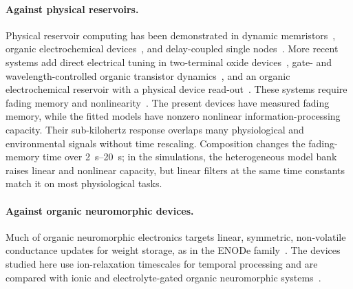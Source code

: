 \documentclass[12pt, twoside]{report}
\begin{document}
\paragraph{Against physical reservoirs.} Physical reservoir computing has been demonstrated in dynamic memristors~\cite{Du2017,Zhong2021}, organic electrochemical devices~\cite{Cucchi2021}, and delay-coupled single nodes~\cite{Appeltant2011}. More recent systems add direct electrical tuning in two-terminal oxide devices~\cite{Lee2025TunableRC}, gate- and wavelength-controlled organic transistor dynamics~\cite{Gao2024GroupedRC}, and an organic electrochemical reservoir with a physical device read-out~\cite{Han2025ReconfigurableOECT}. These systems require fading memory and nonlinearity~\cite{Tanaka2019,Maass2002LSM}. The present devices have measured fading memory, while the fitted models have nonzero nonlinear information-processing capacity. Their sub-kilohertz response overlaps many physiological and environmental signals without time rescaling. Composition changes the fading-memory time over \SIrange{2}{20}{\second}; in the simulations, the heterogeneous model bank raises linear and nonlinear capacity, but linear filters at the same time constants match it on most physiological tasks.

\paragraph{Against organic neuromorphic devices.} Much of organic neuromorphic electronics targets linear, symmetric, non-volatile conductance updates for weight storage, as in the ENODe family~\cite{VanDeBurgt2017,VanDeBurgt2018,Fuller2019}. The devices studied here use ion-relaxation timescales for temporal processing and are compared with ionic and electrolyte-gated organic neuromorphic systems~\cite{Gkoupidenis2017,Cucchi2021}.
\end{document}
